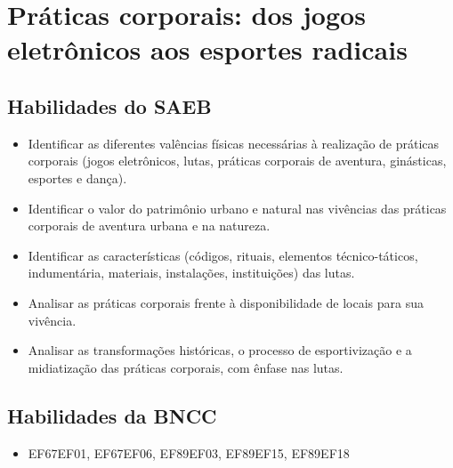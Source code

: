 \chapter{Práticas corporais: dos jogos eletrônicos aos esportes radicais}


\section{Habilidades do SAEB}

\begin{itemize}
\item
  Identificar as diferentes valências físicas necessárias
  à realização de práticas corporais (jogos eletrônicos, lutas, práticas
  corporais de aventura, ginásticas, esportes e dança).
\item
  Identificar o valor do patrimônio urbano e natural nas vivências das
  práticas corporais de aventura urbana e na natureza.
\item
  Identificar as características (códigos, rituais, elementos
  técnico-táticos, indumentária, materiais, instalações, instituições)
  das lutas.
\item
  Analisar as práticas corporais frente à disponibilidade de locais para
  sua vivência.
\item
  Analisar as transformações históricas, o processo de esportivização e
  a midiatização das práticas corporais, com ênfase nas lutas.
\end{itemize}

\section{Habilidades da BNCC}

\begin{itemize}
  \item
EF67EF01, EF67EF06, EF89EF03, EF89EF15, EF89EF18
\end{itemize}


